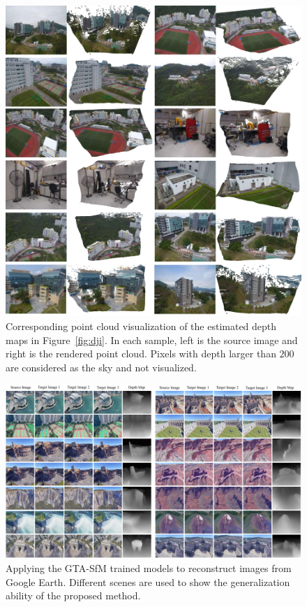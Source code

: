 \documentclass[letterpaper, 10 pt, conference]{ieeeconf}  %
\begin{document}
\begin{figure}[h]
\begin{center}
\includegraphics[width=1.0\linewidth]{figs/dji2.pdf}
\end{center}
\caption{Corresponding point cloud visualization of the estimated depth maps in Figure~\ref{fig:dji}. In each sample, left is the source image and right is the rendered point cloud. Pixels with depth larger than $200$ are considered as the sky and not visualized.}
\label{fig:dji2}
\end{figure}
 
\begin{figure}[h]
\begin{center}
\includegraphics[width=1.0\linewidth]{figs/google_earth_re.pdf}
\end{center}
\caption{Applying the GTA-SfM trained models to reconstruct images from Google Earth. Different scenes are used to show the generalization ability of the proposed method.} 
\label{fig:google_earth}
\end{figure}
 
\end{document}
